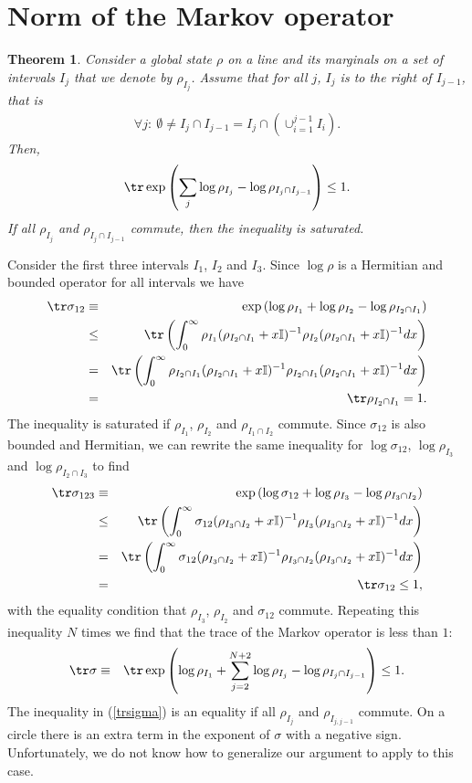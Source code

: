 \documentclass[12pt]{article}
\newtheorem{theorem}{Theorem}[section]
\newcommand{\rb}{\right)}
\newcommand{\lb}{\left(}
\def\bea{\begin{eqnarray}}
\def\eea{\end{eqnarray}}
\newcommand{\nn}{\nonumber}
\begin{document}
\section{Norm of the Markov operator} \label{golden}
\begin{theorem}
Consider a global state $\rho$ on a line and its marginals on a set of intervals $I_j$ that we denote by $\rho_{I_j}$. Assume that for all $j$, $I_j$ is to the right of $I_{j-1}$, that is
\bea
\forall j:\:\emptyset\neq I_j\cap I_{j-1}=I_j\cap (\cup_{i=1}^{j-1} I_i).
\eea
Then,
\bea
\tr \exp\lb\sum_j \log\rho_{I_j}-\log\rho_{I_j\cap I_{j-1}}\rb\leq 1.
\eea
If all $\rho_{I_j}$ and $\rho_{I_j\cap I_{j-1}}$ commute, then the inequality is saturated.
\end{theorem}
Consider the first three intervals $I_1$, $I_2$ and $I_3$. Since $\log\rho$ is a Hermitian and bounded operator for all intervals we have \cite{lieb1973convex}
\bea
\tr \sigma_{12}&\equiv&\exp\lb \log\rho_{I_1}+\log\rho_{I_2}-\log\rho_{I_2\cap I_1}\rb\nn\\
&\leq& \tr\lb \int_0^\infty \rho_{I_1}(\rho_{I_2\cap I_1}+x \mathbb{I})^{-1}\rho_{I_2}(\rho_{I_2\cap I_1}+x \mathbb{I})^{-1}dx\rb\nn\\
&=&\tr\lb \int_0^\infty \rho_{I_2\cap I_1}(\rho_{I_2\cap I_1}+x \mathbb{I})^{-1}\rho_{I_2\cap I_1}(\rho_{I_2\cap I_1}+x \mathbb{I})^{-1}dx\rb\nn\\
&=&\tr\rho_{I_2\cap I_1}=1.
\eea
The inequality is saturated if $\rho_{I_1}$, $\rho_{I_2}$ and $\rho_{I_1\cap I_2}$ commute. Since $\sigma_{12}$ is also bounded and Hermitian, we can rewrite the same inequality for $\log\sigma_{12}$, $\log\rho_{I_3}$ and $\log\rho_{I_2\cap I_3}$ to find
\bea
\tr\sigma_{123}&\equiv&\exp\lb \log\sigma_{12}+\log\rho_{I_3}-\log\rho_{I_3\cap I_2}\rb\nn\\
&\leq& \tr\lb \int_0^\infty \sigma_{12}(\rho_{I_3\cap I_2}+x \mathbb{I})^{-1}\rho_{I_3}(\rho_{I_3\cap I_2}+x \mathbb{I})^{-1}dx\rb\nn\\
&=&\tr\lb \int_0^\infty \sigma_{12}(\rho_{I_3\cap I_2}+x \mathbb{I})^{-1}\rho_{I_3\cap I_2}(\rho_{I_3\cap I_2}+x \mathbb{I})^{-1}dx\rb\nn\\
&=&\tr\sigma_{12}\leq 1,
\eea
with the equality condition that $\rho_{I_3}$, $\rho_{I_2}$ and $\sigma_{12}$ commute. Repeating this inequality $N$ times we find that the trace of the Markov operator is less than $1$:
\bea\label{trsigma}
\tr\sigma&\equiv &\tr\exp\lb\log\rho_{I_1}+\sum_{j=2}^{N+2}\log \rho_{I_j}-\log\rho_{I_j\cap I_{j-1}}\rb\leq 1.
\eea
The inequality in (\ref{trsigma}) is an equality if all $\rho_{I_j}$ and $\rho_{I_{j,j-1}}$ commute. On a circle there is an extra term in the exponent of $\sigma$ with a negative sign. Unfortunately, we do not know how to generalize our argument to apply to this case.





\end{document}
